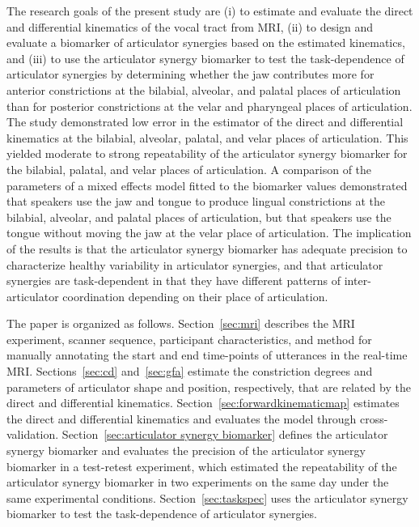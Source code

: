 \documentclass[preprint]{JASAnew}
\begin{document}
The research goals of the present study are 
%
(i) to estimate and evaluate the direct and differential kinematics of the vocal tract from MRI, 
%
(ii) to design and evaluate a biomarker of articulator synergies based on the estimated kinematics, and
%
(iii) to use the articulator synergy biomarker to test the task-dependence of articulator synergies by determining whether the jaw contributes more for anterior constrictions at the bilabial, alveolar, and palatal places of articulation than for posterior constrictions at the velar and pharyngeal places of articulation. 
%
The study demonstrated low error in the estimator of the direct and differential kinematics at the bilabial, alveolar, palatal, and velar places of articulation. 
%
This yielded moderate to strong repeatability of the articulator synergy biomarker for the bilabial, palatal, and velar places of articulation.
%
A comparison of the parameters of a mixed effects model fitted to the biomarker values demonstrated that speakers use the jaw and tongue to produce lingual constrictions at the bilabial, alveolar, and palatal places of articulation, but that speakers use the tongue without moving the jaw at the velar place of articulation. 
%
The implication of the results is that the articulator synergy biomarker has adequate precision to characterize healthy variability in articulator synergies, and that articulator synergies are task-dependent in that they have different patterns of inter-articulator coordination depending on their place of articulation. 


The paper is organized as follows.
%
Section~\ref{sec:mri} describes the MRI experiment, scanner sequence, participant characteristics, and method for manually annotating the start and end time-points of utterances in the real-time MRI.
%
Sections~\ref{sec:cd} and~\ref{sec:gfa} estimate the constriction degrees and parameters of articulator shape and position, respectively, that are related by the direct and differential kinematics. 
% 
Section~\ref{sec:forwardkinematicmap} estimates the direct and differential kinematics and evaluates the model through cross-validation. 
%
Section~\ref{sec:articulator synergy biomarker} defines the articulator synergy biomarker and evaluates the precision of the articulator synergy biomarker in a test-retest experiment, which estimated the repeatability of the articulator synergy biomarker in two experiments on the same day under the same experimental conditions. 
% 
Section~\ref{sec:taskspec} uses the articulator synergy biomarker to test the task-dependence of articulator synergies.   
\end{document}
